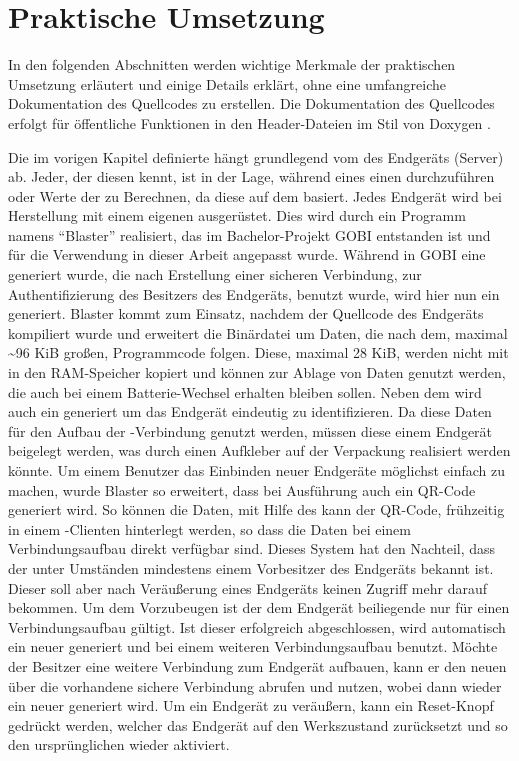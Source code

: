 \chapter{Praktische Umsetzung}
\label{chp:praktisch}

In den folgenden Abschnitten werden wichtige Merkmale der praktischen Umsetzung erläutert und einige Details erklärt,
ohne eine umfangreiche Dokumentation des Quellcodes zu erstellen. Die Dokumentation des Quellcodes erfolgt für öffentliche
Funktionen in den Header-Dateien im Stil von Doxygen \cite{doxygen}.

Die im vorigen Kapitel definierte  hängt grundlegend vom  des Endgeräts (Server) ab. Jeder, der diesen kennt, ist in
der Lage, während eines  einen  durchzuführen oder Werte der  zu Berechnen, da diese auf dem  basiert.
Jedes Endgerät wird bei Herstellung mit einem eigenen  ausgerüstet. Dies wird durch ein Programm namens "`Blaster"' realisiert, das
im Bachelor-Projekt GOBI entstanden ist und für die Verwendung in dieser Arbeit angepasst wurde. Während in GOBI eine  generiert wurde,
die nach Erstellung einer sicheren Verbindung, zur Authentifizierung des Besitzers des Endgeräts, benutzt wurde, wird hier nun ein 
generiert. Blaster kommt zum Einsatz, nachdem der Quellcode des Endgeräts kompiliert wurde und erweitert die Binärdatei um Daten, die nach dem,
maximal \textasciitilde 96 KiB großen, Programmcode folgen. Diese, maximal 28 KiB, werden nicht mit in den RAM-Speicher kopiert und können zur
Ablage von Daten genutzt werden, die auch bei einem Batterie-Wechsel erhalten bleiben sollen. Neben dem  wird auch ein 
generiert um das Endgerät eindeutig zu identifizieren. Da diese Daten für den Aufbau der -Verbindung genutzt werden, müssen diese
einem Endgerät beigelegt werden, was durch einen Aufkleber auf der Verpackung realisiert werden könnte. Um einem Benutzer das Einbinden neuer
Endgeräte möglichst einfach zu machen, wurde Blaster so erweitert, dass bei Ausführung auch ein QR-Code generiert wird. So können die Daten, mit
Hilfe des kann der QR-Code, frühzeitig in einem -Clienten hinterlegt werden, so dass die Daten bei einem Verbindungsaufbau direkt
verfügbar sind. Dieses System hat
den Nachteil, dass der  unter Umständen mindestens einem Vorbesitzer des Endgeräts bekannt ist. Dieser soll aber nach Veräußerung eines
Endgeräts keinen Zugriff mehr darauf bekommen. Um dem Vorzubeugen ist der dem Endgerät beiliegende  nur für einen Verbindungsaufbau
gültigt. Ist dieser erfolgreich abgeschlossen, wird automatisch ein neuer  generiert und bei einem weiteren Verbindungsaufbau benutzt.
Möchte der Besitzer eine weitere Verbindung zum Endgerät aufbauen, kann er den neuen  über die vorhandene sichere Verbindung abrufen
und nutzen, wobei dann wieder ein neuer  generiert wird. Um ein Endgerät zu veräußern, kann ein Reset-Knopf gedrückt werden, welcher das
Endgerät auf den Werkszustand zurücksetzt und so den ursprünglichen  wieder aktiviert.



